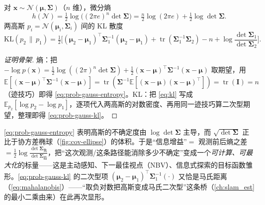 \begin{theorem}\label{thm:gauss-info}
对 $\mathbf{x}\sim\mathcal{N}(\boldsymbol{\mu},\boldsymbol{\Sigma})$（$n$ 维），微分熵
\begin{equation}
  h(\mathcal{N})=\tfrac12\log\big((2\pi e)^n\det\boldsymbol{\Sigma}\big)=\tfrac{n}{2}\log(2\pi e)+\tfrac12\log\det\boldsymbol{\Sigma}.
  \label{eq:prob-gauss-entropy}
\end{equation}
两高斯 $p_i=\mathcal{N}(\boldsymbol{\mu}_i,\boldsymbol{\Sigma}_i)$ 间的 KL 散度
\begin{equation}
  \mathrm{KL}(p_2\,\|\,p_1)=\tfrac12\Big[(\boldsymbol{\mu}_2-\boldsymbol{\mu}_1)^\top\boldsymbol{\Sigma}_1^{-1}(\boldsymbol{\mu}_2-\boldsymbol{\mu}_1)+\operatorname{tr}(\boldsymbol{\Sigma}_1^{-1}\boldsymbol{\Sigma}_2)-n+\log\frac{\det\boldsymbol{\Sigma}_1}{\det\boldsymbol{\Sigma}_2}\Big].
  \label{eq:prob-gauss-kl}
\end{equation}
\end{theorem}
\begin{proof}[证明骨架]
熵：把 $-\log p(\mathbf{x})=\tfrac12\log((2\pi)^n\det\boldsymbol{\Sigma})+\tfrac12(\mathbf{x}-\boldsymbol{\mu})^\top\boldsymbol{\Sigma}^{-1}(\mathbf{x}-\boldsymbol{\mu})$ 取期望，用 $\mathbb{E}[(\mathbf{x}-\boldsymbol{\mu})^\top\boldsymbol{\Sigma}^{-1}(\mathbf{x}-\boldsymbol{\mu})]=\operatorname{tr}(\boldsymbol{\Sigma}^{-1}\mathbb{E}[(\mathbf{x}-\boldsymbol{\mu})(\mathbf{x}-\boldsymbol{\mu})^\top])=\operatorname{tr}(\mathbf{I})=n$（迹技巧）即得 \cref{eq:prob-gauss-entropy}。KL：把 \cref{eq:kl} 写成 $\mathbb{E}_{p_2}[\log p_2-\log p_1]$，逐项代入两高斯的对数密度、再用同一迹技巧算二次型期望，整理即得 \cref{eq:prob-gauss-kl}。
\end{proof}

\begin{insight}
\cref{eq:prob-gauss-entropy} 表明高斯的不确定度由 $\log\det\boldsymbol{\Sigma}$ 主导，而 $\sqrt{\det\boldsymbol{\Sigma}}$ 正比于协方差椭球（\cref{fig:cov-ellipse}）的体积。于是“信息增益”$=$ 观测前后熵之差 $=\tfrac12\log\frac{\det\boldsymbol{\Sigma}_{\text{先}}}{\det\boldsymbol{\Sigma}_{\text{后}}}$，把“这次观测/这条路径能消除多少不确定”变成一个\emph{可计算、可最大化}的标量——这是主动感知、下一最佳视点（NBV）、信息式探索的目标函数雏形。\cref{eq:prob-gauss-kl} 的二次型项 $(\boldsymbol{\mu}_2-\boldsymbol{\mu}_1)^\top\boldsymbol{\Sigma}_1^{-1}(\cdot)$ 又恰是马氏距离（\cref{eq:mahalanobis}）——“取负对数把高斯变成马氏二次型”这条桥（\cref{ch:slam_est} 的最小二乘由来）在此再次显形。
\end{insight}


